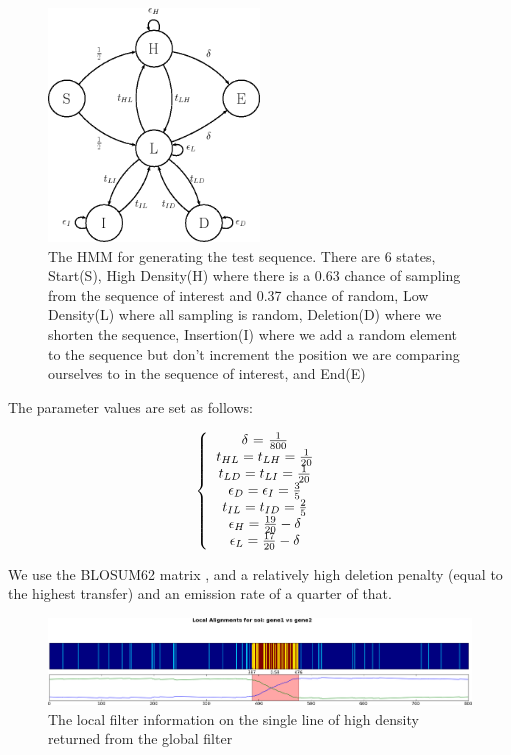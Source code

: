 \documentclass[phd,tocprelim]{cornell}
\begin{document}
\begin{figure}[hpt]
	\centering
		\includegraphics[width=0.5\textwidth]{figures/velvetrope/HMMpic.png}
        \caption[HMM for synthetic NW comparison]{The HMM for generating the test sequence. There are 6 states, Start(S), High Density(H) where there is a 0.63 chance of sampling from the sequence of interest and 0.37 chance of random, Low Density(L) where all sampling is random, Deletion(D) where we shorten the sequence, Insertion(I) where we add a random element to the sequence but don't increment the position we are comparing ourselves to in the sequence of interest, and End(E)}
	\label{fig:99}
\end{figure}

The parameter values are set as follows:

\begin{equation}
    \left\{\begin{tabular}{c} $\delta$ = $\frac{1}{800}$ \\ $t_{HL} = t_{LH} = \frac{1}{20}$ \\ $t_{LD} = t_{LI} = \frac{1}{20}$ \\ $\epsilon_{D} = \epsilon_{I} = \frac{3}{5}$ \\ $t_{IL} = t_{ID} = \frac{2}{5}$ \\ $\epsilon_{H} = \frac{19}{20} - \delta$ \\ $\epsilon_{L} = \frac{17}{20} - \delta$ \end{tabular} \right.
\end{equation}

We use the BLOSUM62 matrix \cite{Henikoff1992}, and a relatively high deletion penalty (equal to the highest transfer) and an emission rate of a quarter of that.

\begin{figure}[hpt]
	\centering
		\includegraphics[width=1.0\textwidth]{figures/velvetrope/hmm1_1.png}
        \caption[Local Velvetrope filter of NW HMM test]{The local filter information on the single line of high density returned from the global filter}
	\label{fig:05}
\end{figure}
\end{document}
